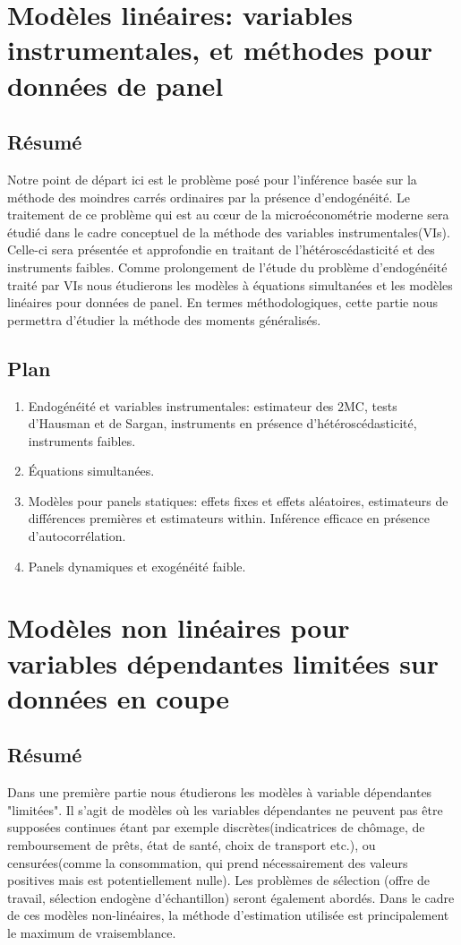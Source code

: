  \section{Modèles linéaires: variables instrumentales, et méthodes pour données de panel}
 \subsection*{Résumé}
Notre point de départ ici est le problème posé pour l'inférence 
basée sur la méthode des moindres carrés ordinaires par la présence d'endogénéité. 
Le traitement de ce problème qui est au cœur de la microéconométrie moderne sera étudié 
dans le cadre conceptuel de la méthode des variables instrumentales(VIs). 
Celle-ci sera présentée et approfondie en traitant de l'hétéroscédasticité et des instruments faibles. 
Comme prolongement de l'étude du problème d'endogénéité traité par VIs nous étudierons les modèles à équations 
simultanées et les modèles linéaires pour données de panel. 
En termes méthodologiques, cette partie nous permettra d'étudier la méthode des moments généralisés.

\subsection*{Plan}

\begin{enumerate}[resume]
 \item Endogénéité et variables instrumentales: estimateur 
 des 2MC, tests d'Hausman et de Sargan,
instruments en présence d'hétéroscédasticité, instruments faibles.
\item Équations simultanées.
\item Modèles pour panels statiques: effets fixes et effets 
aléatoires, estimateurs de différences premières 
et estimateurs within. Inférence efficace en présence d'autocorrélation.
\item Panels dynamiques et exogénéité faible.
\end{enumerate}

\section{Modèles non linéaires pour variables dépendantes limitées sur données en coupe}
 
\subsection*{Résumé}
 Dans une première partie nous étudierons les modèles à variable dépendantes "limitées". Il s'agit de modèles 
 où les variables dépendantes ne peuvent pas être supposées continues étant par exemple discrètes(indicatrices de chômage, de remboursement de prêts, état de santé, choix de transport etc.),
 ou censurées(comme la consommation, qui prend nécessairement des valeurs positives mais est potentiellement nulle). 
 Les problèmes de sélection (offre de travail, sélection endogène d'échantillon) seront également abordés. 
 Dans le cadre de ces modèles non-linéaires, la méthode d'estimation utilisée est principalement 
 le maximum de vraisemblance.

